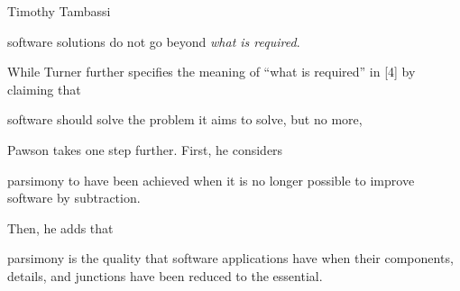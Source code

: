 \begin{artengenv}{Timothy Tambassi}
\setcounter{saveenumtambassi}{\value{enumi}}

\begin{enumerate}[label={[\arabic*]}]

\setcounter{enumi}{\value{saveenumtambassi}}

\item software solutions do not go beyond \textit{what is required}.

\end{enumerate}

While Turner further specifies the meaning of ``what is required'' in [4] by claiming that



\setcounter{saveenumtambassi}{\value{enumi}}

\begin{enumerate}[label={[\arabic*]}]

\setcounter{enumi}{\value{saveenumtambassi}}

\item software should solve the problem it aims to solve, but no more,

\end{enumerate}

Pawson 
\parencite*[][]{pawson_minimum_1998} %
 takes one step further. First, he considers



\setcounter{saveenumtambassi}{\value{enumi}}

\begin{enumerate}[label={[\arabic*]}]

\setcounter{enumi}{\value{saveenumtambassi}}

\item parsimony to have been achieved when it is no longer possible to improve software by subtraction.

\end{enumerate}

Then, he adds that

\enlargethispage{1.5\baselineskip}

\setcounter{saveenumtambassi}{\value{enumi}}

\begin{enumerate}[label={[\arabic*]}]

\setcounter{enumi}{\value{saveenumtambassi}}

\item parsimony is the quality that software applications have when their components, details, and junctions have been reduced to the essential.


\end{enumerate}
\end{artengenv}
